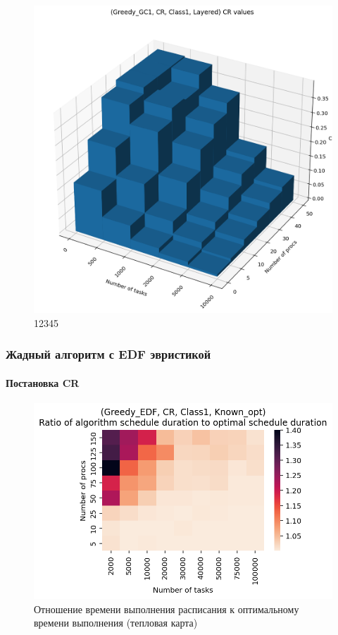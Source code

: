 \begin{figure}[!htbp]
    \centering
    \includegraphics[width=\textwidth]{imgs/layered_class_1/CR/cr_3d.png}
    \caption{12345}    
\end{figure}

\subsubsection{Жадный алгоритм с EDF эвристикой}

\paragraph{Постановка CR}

\begin{figure}[!htbp]
    \centering
    \includegraphics[width=\textwidth]{imgs/ideal_1/CR_EDF/th.png}
    \caption{Отношение времени выполнения расписания к оптимальному времени выполнения (тепловая карта)}
    \label{fig:CR-EDF-times-heatmap}
\end{figure}


